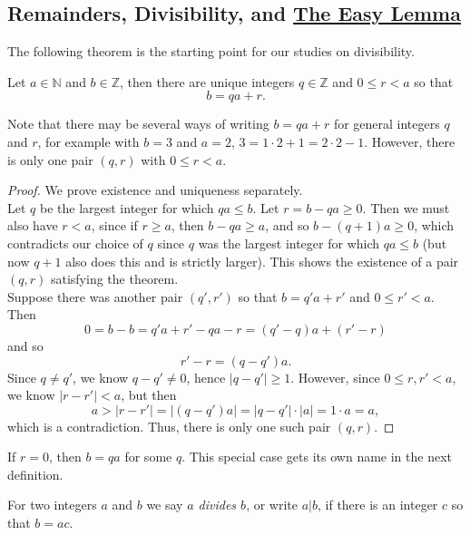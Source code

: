\documentclass[11pt,dvipsnames]{book}
\numberwithin{equation}{section} %
\numberwithin{figure}{section} %
\numberwithin{table}{section} %
\begin{document}
\subsection{Remainders, Divisibility, and \hyperref[l:easy-lemma]{\hyperref[l:easy-lemma]{The Easy Lemma} } }


The following theorem is the starting point for our studies on divisibility. 

\begin{theorem}
Let  $a\in\mathbb{N}$ and $b\in\mathbb{Z}$, then there are unique integers $q\in \mathbb{Z}$ and $0\leq r<a$ so that 
\[
b=qa+r.
\]
\end{theorem}


Note that there may be several ways of writing $b=qa+r$ for general integers $q$ and $r$, for example with $b=3$ and $a=2$, $3=1\cdot 2 + 1 = 2\cdot 2 -1$. However, there is only one pair $(q,r)$ with $0\leq r<a$. 

\begin{proof}
We prove existence and uniqueness separately. \\

 Let $q$ be the largest integer for which $qa\leq b$. Let $r=b-qa\geq 0$. Then we must also have $r<a$, since if $r\geq a$, then $b-qa\geq a$, and so $b-(q+1)a\geq 0$, which contradicts our choice of $q$ since $q$ was the largest integer for which $qa\leq b$ (but now $q+1$ also does this and is strictly larger). This shows the existence of a pair $(q,r)$ satisfying the theorem. \\

 Suppose there was another pair $(q',r')$ so that $b=q'a+r'$ and $0\leq r'<a$. Then
\[
0=b-b=q'a+r'-qa-r = (q'-q)a+(r'-r)\]
and so 
\[
r'-r=(q-q')a.\]
Since $q\neq q'$, we know $q-q'\neq 0$, hence $|q-q'|\geq 1$. However, since $0\leq r,r'<a$, we know $|r-r'|<a$, but then
\[
a>|r-r'|=|(q-q')a|=|q-q'|\cdot |a|=1\cdot a=a,\]
which is a contradiction. Thus, there is only one such pair $(q,r)$. 

\end{proof}


If $r=0$, then $b=qa$ for some $q$. This special case gets its own name in the next definition. 


\begin{definition}
For two integers $a$ and $b$ we say {\it $a$ divides $b$}, or write $a|b$, if there is an integer $c$ so that $b=ac$.
\end{definition}
\end{document}
